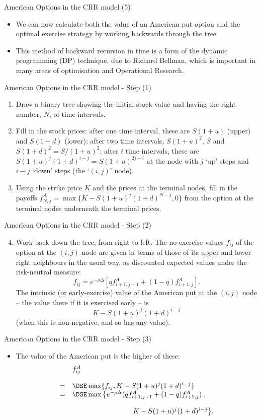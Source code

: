 { American Options in the CRR model (5)}

\begin{itemize}
  \item We can now calculate both the value of an American put option and
the optimal exercise strategy by working backwards through the
tree
 \item This method of backward recursion in time is a form of the
dynamic programming (DP) technique, \label{dynamic programming}
due to Richard Bellman, which is important in many areas of
optimisation and Operational Research.
\end{itemize}

{American Options in the CRR model - Step (1)}

\begin{enumerate}
  \item  Draw a binary
tree showing the initial stock value and having the
right number, $N$, of time intervals.
  \item  Fill in the stock prices: after one time interval, these are
$S(1+u)$ (upper) and $S(1+d)$ (lower); after two time intervals,
$S(1+u)^2$, $S$ and $ S(1+d)^2 = S/(1+u)^2$; after $i$ time
intervals, these are $S(1+u)^j (1+d)^{i-j} = S (1+u)^{2j- i}$ at
the node with
$j$ `up' steps and $i-j$ `down' steps (the `$(i,j)$' node).
  \item  Using the strike price $K$ and the prices at the terminal
nodes, fill in the payoffs $f^A_{N,j} = \max\{K - S (1+u)^j
(1+d)^{N-j}, 0\}$ from the option
at the terminal nodes underneath the terminal prices.
\end{enumerate}

{American Options in the CRR model - Step (2)}
\begin{enumerate}
\setcounter{enumi}{3}
\item  Work back down the tree, from right to left. The no-exercise
values $f_{ij}$ of the option at the $(i,j)$ node are given in
terms of those of its upper and lower right neighbours in the
usual way, as discounted expected values under the risk-neutral
measure:
$$
f_{ij} = e^{-\rho \Delta } [q f^A_{i+1,j+1} + (1 - q)
f^A_{i+1,j}].
$$
The intrinsic (or early-exercise) value of the American put at the
$(i,j)$
 node -- the value there if it is exercised early -- is
$$
K - S (1+u)^j (1+d)^{i-j}
$$
(when this is non-negative, and so has any value).
\end{enumerate}

{American Options in the CRR model - Step (3)}
\begin{itemize}
  \item The value of
the American put is the higher of these:
$$
\begin{array}{ll}
&f^A_{ij} \\*[12pt]=&\DSE \max\{f_{ij}, K - S (1+u)^j (1+d)^{i-j}\}\\
=&\DSE \max\left\{e^{-\rho \Delta} (q f^A_{i+1,j+1} + (1 - q)
f^A_{i+1,j})\right.,\\*[12pt]
&\hspace{3cm} \left. K - S (1+u)^j (1+d)^{i-j}\right\}\!.
\end{array}
$$
\end{itemize}

